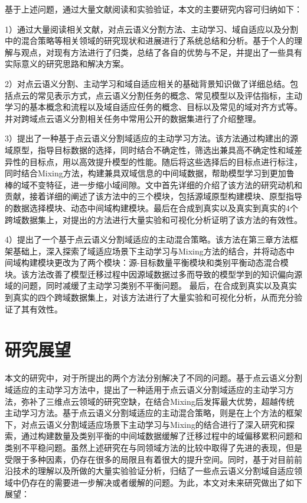 基于上述问题，通过大量文献阅读和实验验证，本文的主要研究内容可归纳如下：

1）通过大量阅读相关文献，对点云语义分割方法、主动学习、域自适应以及分割中的混合策略等相关领域的研究现状和进展进行了系统总结和分析。基于个人的理解与观点，对现有方法进行了归类，总结了各自的优势与不足，并提出了一些具有实际意义的研究思路和解决方案。

2）对点云语义分割、主动学习和域自适应相关的基础背景知识做了详细总结。包括点云的常见表示方式，点云语义分割任务的概念、常见模型以及评估指标，主动学习的基本概念和流程以及域自适应任务的概念、目标以及常见的域对齐方式等。并对跨域点云语义分割相关任务中常用公开的数据集进行了介绍整理。

3）提出了一种基于点云语义分割域适应的主动学习方法。该方法通过构建出的源域原型，指导目标数据的选择，同时结合不确定性，筛选出兼具高不确定性和域差异性的目标点，用以高效提升模型的性能。随后将这些选择后的目标点进行标注，同时结合Mixing方法，构建兼具双域信息的中间域数据，帮助模型学习到更加鲁棒的域不变特征，进一步缩小域间隙。文中首先详细的介绍了该方法的研究动机和贡献，接着详细的阐述了该方法中的三个模块，包括源域原型构建模块、原型指导的数据选择模块、动态中间域构建模块。最后在合成到真实以及真实到真实的4个跨域数据集上，对提出的方法进行大量实验和可视化分析证明了该方法的有效性。

4）提出了一个基于点云语义分割域适应的主动混合策略。该方法在第三章方法框架基础上，深入探索了域适应场景下主动学习与Mixing方法的结合，并将动态中间域构建模块更改为了两个模块：源-目标数量平衡模块和类别平衡动态混合模块。该方法改善了模型迁移过程中因源域数据过多而导致的模型学到的知识偏向源域的问题，同时减缓了主动学习类别不平衡问题。
最后，在合成到真实以及真实到真实的四个跨域数据集上，对该方法进行了大量实验和可视化分析，从而充分验证了其有效性。

\section{研究展望}
本文的研究中，对于所提出的两个方法分别解决了不同的问题。基于点云语义分割域适应的主动学习方法中，提出了一种适用于点云语义分割域适应的主动学习方法，弥补了三维点云领域的研究空缺，在结合Mixing后发挥最大优势，超越传统主动学习方法。基于点云语义分割域适应的主动混合策略，则是在上个方法的框架下，对点云语义分割域适应场景下主动学习与Mixing的结合进行了深入研究和探索，通过构建数量及类别平衡的中间域数据缓解了迁移过程中的域偏移累积问题和类别不平稳问题。虽然上述研究在与同领域方法的比较中取得了先进的表现，但是受限于多种因素，仍存在很多的局限且有着很大的提升空间。同时，基于对目前前沿技术的理解以及所做的大量实验验证分析，归结了一些点云语义分割域自适应领域中仍存在的需要进一步解决或者缓解的问题。为此，本文对未来研究做出了如下展望：

